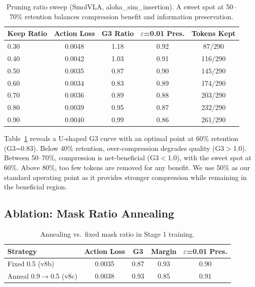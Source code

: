 \documentclass[conference]{corl_2026}
\begin{document}
\begin{table}[t]
\centering
\caption{Pruning ratio sweep (SmolVLA, aloha\_sim\_insertion). A sweet spot at 50--70\% retention balances compression benefit and information preservation.}
\label{tab:ratio_sweep}
\small
\begin{tabular}{@{}lcccc@{}}
\toprule
Keep Ratio & Action Loss & G3 Ratio & $\varepsilon$=0.01 Pres. & Tokens Kept \\
\midrule
0.30 & 0.0048 & 1.18 & 0.92 & 87/290 \\
0.40 & 0.0042 & 1.03 & 0.91 & 116/290 \\
0.50 & 0.0035 & 0.87 & 0.90 & 145/290 \\
0.60 & 0.0034 & 0.83 & 0.89 & 174/290 \\
0.70 & 0.0036 & 0.89 & 0.88 & 203/290 \\
0.80 & 0.0039 & 0.95 & 0.87 & 232/290 \\
0.90 & 0.0040 & 0.99 & 0.86 & 261/290 \\
\bottomrule
\end{tabular}
\end{table}

Table~\ref{tab:ratio_sweep} reveals a U-shaped G3 curve with an optimal point at 60\% retention (G3=0.83). Below 40\% retention, over-compression degrades quality (G3$>$1.0). Between 50--70\%, compression is net-beneficial (G3$<$1.0), with the sweet spot at 60\%. Above 80\%, too few tokens are removed for any benefit. We use 50\% as our standard operating point as it provides stronger compression while remaining in the beneficial region.

\subsection{Ablation: Mask Ratio Annealing}
\label{sec:annealing}

\begin{table}[t]
\centering
\caption{Annealing vs.\ fixed mask ratio in Stage 1 training.}
\label{tab:annealing}
\small
\begin{tabular}{@{}lcccc@{}}
\toprule
Strategy & Action Loss & G3 & Margin & $\varepsilon$=0.01 Pres. \\
\midrule
Fixed 0.5 (v8b) & 0.0035 & 0.87 & 0.93 & 0.90 \\
Anneal 0.9$\rightarrow$0.5 (v8c) & 0.0038 & 0.93 & 0.85 & 0.91 \\
\bottomrule
\end{tabular}
\end{table}
\end{document}
